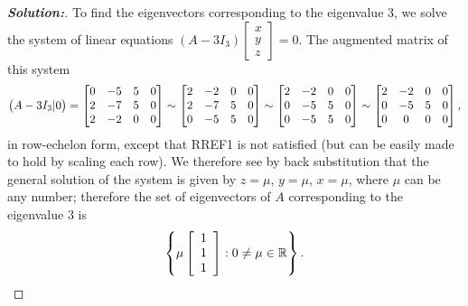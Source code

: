\documentclass[a4paper]{amsart}
\theoremstyle{definition}
\newenvironment{solution}{\begin{proof}[\textbf{Solution:}] \vphantom{u}}{\end{proof}}
\begin{document}
\begin{solution}
 To find the eigenvectors corresponding to the eigenvalue $3$, we
 solve the system of linear equations $(A - 3I_3)\left[
 \begin{array}{c}x \\ y\\z
 \end{array} \right] = 0$. The augmented matrix of this system
 \[
 \big(A - 3I_3|0\big) = \left[\begin{matrix} 0 & -5 & 5 &0\\
     2 & -7 & 5 &0\\
     2 & -2 & 0&0\end{matrix}\right] \sim
 \left[\begin{matrix} 2 & -2 & 0 &0\\
     2 & -7 & 5 &0\\
     0 & -5 & 5&0\end{matrix}\right] \sim
 \left[\begin{matrix} 2 & -2 & 0 &0\\
     0 & -5 & 5 &0\\
     0 & -5 & 5&0\end{matrix}\right] \sim
 \left[\begin{matrix} 2 & -2 & 0 &0\\
     0 & -5 & 5 &0\\
     0 & 0 & 0&0\end{matrix}\right],
 \]
 in row-echelon form, except that RREF1 is not satisfied (but
 can be easily made to hold by scaling each row).
 We therefore see by back substitution that
 the general solution of the system is given by $z = \mu$, $y =
 \mu$, $x = \mu$,  where $\mu$ can be any number; therefore the set
 of eigenvectors of $A$ corresponding to the eigenvalue $3$ is
 \[
 \left\{ \mu \left[ \begin{array}{c} 1\\1\\1
 \end{array} \right] : 0 \neq \mu \in {\mathbb{R}} \right\}.
 \]
\end{solution}
\end{document}
